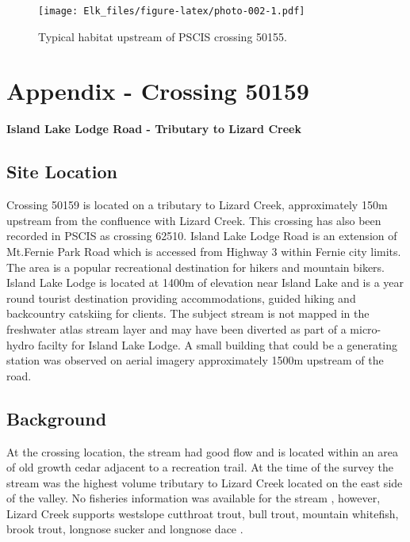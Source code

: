 \documentclass[
]{book}
\begin{document}
\begin{figure}
\centering
\texttt{[image: Elk\_files/figure-latex/photo-002-1.pdf]}
\caption{\label{fig:photo-002}Typical habitat upstream of PSCIS crossing 50155.}
\end{figure}

\hypertarget{appendix---crossing-50159}{%
\chapter*{Appendix - Crossing 50159}\label{appendix---crossing-50159}}

\textbf{Island Lake Lodge Road - Tributary to Lizard Creek}

\hypertarget{site-location-1}{%
\section*{Site Location}\label{site-location-1}}

Crossing 50159 is located on a tributary to Lizard Creek, approximately 150m upstream from the confluence with Lizard Creek. This crossing has also been recorded in PSCIS as crossing 62510. Island Lake Lodge Road is an extension of Mt.Fernie Park Road which is accessed from Highway 3 within Fernie city limits. The area is a popular recreational destination for hikers and mountain bikers. Island Lake Lodge is located at 1400m of elevation near Island Lake and is a year round tourist destination providing accommodations, guided hiking and backcountry catskiing for clients. The subject stream is not mapped in the freshwater atlas stream layer and may have been diverted as part of a micro-hydro facilty for Island Lake Lodge. A small building that could be a generating station was observed on aerial imagery approximately 1500m upstream of the road.

\hypertarget{background-2}{%
\section*{Background}\label{background-2}}

At the crossing location, the stream had good flow and is located within an area of old growth cedar adjacent to a recreation trail. At the time of the survey the stream was the highest volume tributary to Lizard Creek located on the east side of the valley. No fisheries information was available for the stream \citep{moeStreamInventorySample}, however, Lizard Creek supports westslope cutthroat trout, bull trout, mountain whitefish, brook trout, longnose sucker and longnose dace \citep{data_fish_obs}.
\end{document}
